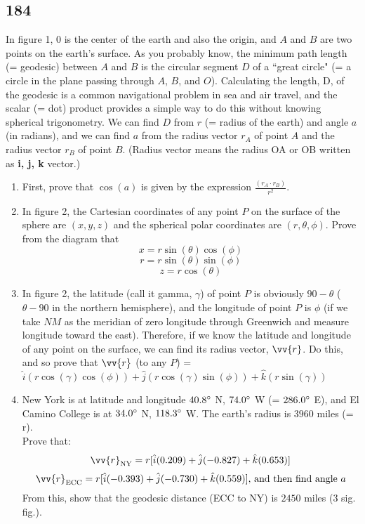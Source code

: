\documentclass{article}
\begin{document}
\subsection{184}

In figure 1, 0 is the center of the earth and also the origin, and $ A $ and $ B $ are two points on the earth's surface. As you probably know, the minimum path length (= geodesic) between $ A $ and $ B $ is the circular segment $ D $ of a ``great circle" (= a circle in the plane passing through $ A $, $ B $, and $ O $). Calculating the length, D, of the geodesic is a common navigational problem in sea and air travel, and the scalar (= dot) product provides a simple way to do this without knowing spherical trigonometry. We can find $ D $ from  $ r $ (= radius of the earth) and angle $ a $ (in radians), and we can find $ a $ from the radius vector $ r_A $ of point $ A $ and the radius vector $ r_B $ of point $ B $. (Radius vector means the radius OA or OB written as \textbf{i, j, k} vector.)

\begin{enumerate}[label=(\alph*)]
    \item First, prove that $ \cos(a) $ is given by the expression $ \frac{\left(r_A \cdot r_B\right)}{r^2} $.
    \item In figure 2, the Cartesian coordinates of any point $ P $ on the surface of the sphere are $ (x, y, z) $ and the spherical polar coordinates are $ (r, \theta, \phi) $. Prove from the diagram that
        $$ x = r\sin(\theta)\cos(\phi) $$
        $$ r = r\sin(\theta)\sin(\phi) $$
        $$ z = r\cos(\theta) $$
    \item In figure 2, the latitude (call it gamma, $ \gamma $) of point $ P $ is obviously $ 90 - \theta $ ($ \theta - 90 $ in the northern hemisphere), and the longitude of point $ P $ is $ \phi $ (if we take $ NM $ as the meridian of zero longitude through Greenwich and measure longitude toward the east). Therefore, if we know the latitude and longitude of any point on the surface, we can find its radius vector, $ \vv{r} $. Do this, and so prove that $ \vv{r} $ (to any $ P $) = $ \hat{i}(r\cos(\gamma)\cos(\phi)) + \hat{j}(r\cos(\gamma)\sin(\phi)) + \hat{k}(r\sin(\gamma)) $
    \item New York is at latitude and longitude $ 40.8\degree $ N, $ 74.0\degree $ W (= $ 286.0\degree $ E), and El Camino College is at $ 34.0\degree $ N, $ 118.3\degree $ W. The earth's radius is $ 3960 $ miles (= r). \\
        Prove that:
        $$ \vv{r}_{\text{NY}} = r[\hat{i}(0.209) + \hat{j}(-0.827) + \hat{k}(0.653)] $$
        $$ \vv{r}_{\text{ECC}} = r[\hat{i}(-0.393) + \hat{j}(-0.730) + \hat{k}(0.559)] \text{, and then find angle $ a $} $$
    From this, show that the geodesic distance (ECC to NY) is $ 2450 $ miles ($ 3 $ sig. fig.).
\end{enumerate}
\end{document}
